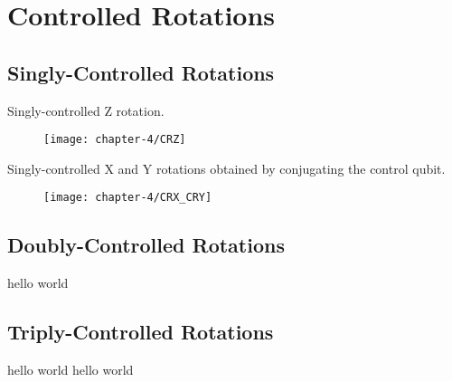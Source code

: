 \chapter{\label{controlled-rotations}Controlled Rotations}

\section{Singly-Controlled Rotations}
Singly-controlled Z rotation.

\begin{figure}[hb]
    \centering
    \texttt{[image: chapter-4/CRZ]}
\end{figure}

Singly-controlled X and Y rotations obtained by conjugating the control qubit.

\begin{figure}[hb]
    \centering
    \texttt{[image: chapter-4/CRX\_CRY]}
\end{figure}


\section{Doubly-Controlled Rotations}
hello world


\section{Triply-Controlled Rotations}
hello world
hello world

